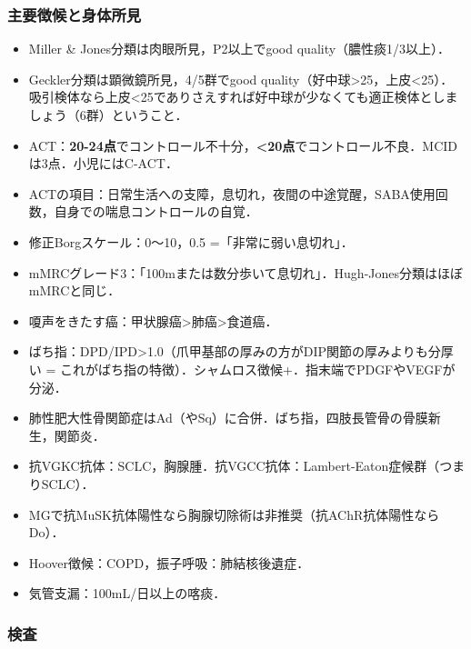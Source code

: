 \subsubsection{主要徴候と身体所見}

\begin{itemize}
\item Miller \& Jones分類は肉眼所見，P2以上でgood quality（膿性痰1/3以上）．
\item Geckler分類は顕微鏡所見，4/5群でgood quality（好中球>25，上皮<25）．吸引検体なら上皮<25でありさえすれば好中球が少なくても適正検体としましょう（6群）ということ．

\item ACT：\textbf{20-24点}でコントロール不十分，\textbf{<20点}でコントロール不良．MCIDは3点．小児にはC-ACT．
\item ACTの項目：日常生活への支障，息切れ，夜間の中途覚醒，SABA使用回数，自身での喘息コントロールの自覚．
\item 修正Borgスケール：0〜10，0.5 =「非常に弱い息切れ」．
\item mMRCグレード3：「100mまたは数分歩いて息切れ」．Hugh-Jones分類はほぼmMRCと同じ．


\item 嗄声をきたす癌：甲状腺癌>肺癌>食道癌．
\item ばち指：DPD/IPD>1.0（爪甲基部の厚みの方がDIP関節の厚みよりも分厚い = これがばち指の特徴）．シャムロス徴候+．指末端でPDGFやVEGFが分泌．
\item 肺性肥大性骨関節症はAd（やSq）に合併．ばち指，四肢長管骨の骨膜新生，関節炎．
\item 抗VGKC抗体：SCLC，胸腺腫．抗VGCC抗体：Lambert-Eaton症候群（つまりSCLC）．
\item MGで抗MuSK抗体陽性なら胸腺切除術は非推奨（抗AChR抗体陽性ならDo）．
\item Hoover徴候：COPD，振子呼吸：肺結核後遺症．
\item 気管支漏：100mL/日以上の喀痰．
\end{itemize}


\subsubsection{検査}

